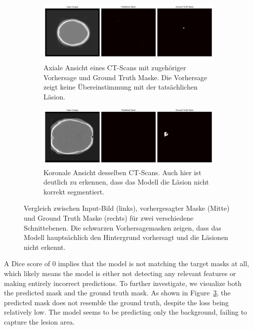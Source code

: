 \begin{figure}[htbp]
    \centering
    \begin{subfigure}{\textwidth}
        \centering
        \includegraphics[width=\textwidth]{figures/Figure_2.png}
        \caption{Axiale Ansicht eines CT-Scans mit zugehöriger Vorhersage und Ground Truth Maske. Die Vorhersage zeigt keine Übereinstimmung mit der tatsächlichen Läsion.}
        \label{fig:predicted_mask_axial}
    \end{subfigure}
    \vspace{1em}
    \begin{subfigure}{\textwidth}
        \centering
        \includegraphics[width=\textwidth]{figures/Figure_3.png}
        \caption{Koronale Ansicht desselben CT-Scans. Auch hier ist deutlich zu erkennen, dass das Modell die Läsion nicht korrekt segmentiert.}
        \label{fig:predicted_mask_coronal}
    \end{subfigure}
    \caption{Vergleich zwischen Input-Bild (links), vorhergesagter Maske (Mitte) und Ground Truth Maske (rechts) für zwei verschiedene Schnittebenen. Die schwarzen Vorhersagemasken zeigen, dass das Modell hauptsächlich den Hintergrund vorhersagt und die Läsionen nicht erkennt.}
    \label{fig:prediction_comparison}
\end{figure}

A Dice score of 0 implies that the model is not matching the target masks at all, which likely means the model is either not detecting any relevant features or making entirely incorrect predictions. To further investigate, we visualize both the predicted mask and the ground truth mask. As shown in Figure~\ref{fig:prediction_comparison}, the predicted mask does not resemble the ground truth, despite the loss being relatively low. The model seems to be predicting only the background, failing to capture the lesion area.

